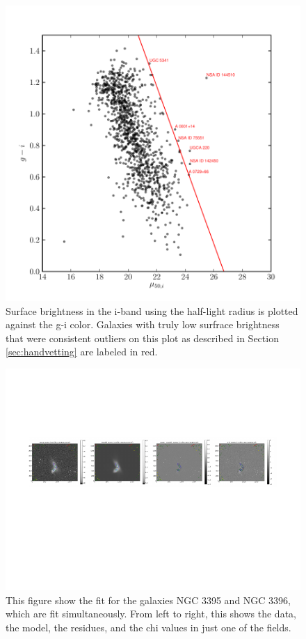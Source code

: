 \documentclass[12pt,preprint,pdftex]{aastex}
\begin{document}
\begin{figure}
\centering
\includegraphics[trim= 0mm 0mm 0mm 10mm]{sb_color_outliers.pdf}
\caption{Surface brightness in the i-band using the half-light radius is plotted against the g-i color. Galaxies with truly low surfrace brightness that were consistent outliers on this plot as described in Section \ref{sec:handvetting} are labeled in red.}
\label{fig:outliers}
\end{figure}

\begin{figure}
\centering
\includegraphics[trim = .9cm 4.5cm 1.15cm 2.9cm,clip=true,width=\textwidth] {gooddouble.pdf}
\caption{This figure show the fit for the galaxies NGC 3395 and NGC
 3396, which are fit simultaneously. From left to right, this shows
 the data, the model, the residues, and the chi values in just one of
 the fields.}
\label{fig:gooddouble}
\end{figure}
\end{document}
